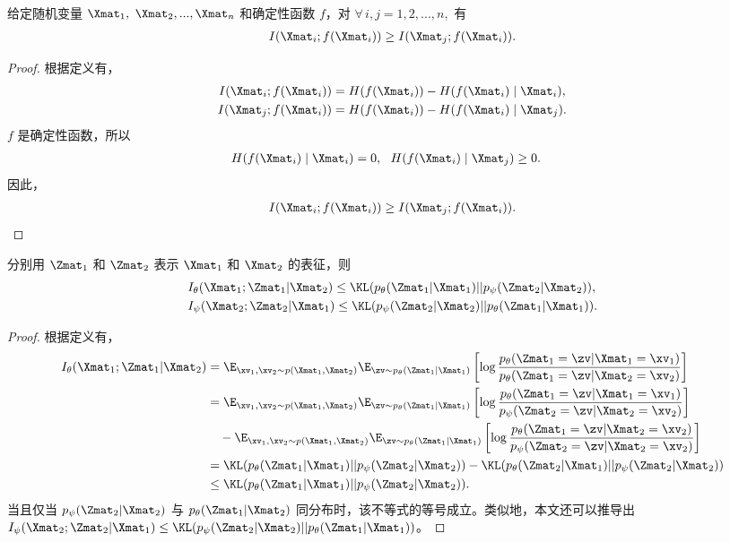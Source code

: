 \begin{lemma}
\label{lem:mi_xz_mutual}
给定随机变量 $\Xmat_1,$ $\Xmat_2, ..., \Xmat_n$ 和确定性函数 $f$，对 $\forall \, i, j = 1, 2, ..., n,$ 有
\begin{align}
I(\Xmat_i; f(\Xmat_i)) \ge I(\Xmat_j; f(\Xmat_i)). 
\end{align}
\end{lemma}
\begin{proof}
根据定义有，
\begin{align*}
I(\Xmat_i; f(\Xmat_i)) &= H(f(\Xmat_i)) - H(f(\Xmat_i) \mid \Xmat_i), \\
I(\Xmat_j; f(\Xmat_i)) &= H(f(\Xmat_i)) - H(f(\Xmat_i) \mid \Xmat_j). 
\end{align*}
$f$ 是确定性函数，所以
\begin{align*}
H(f(\Xmat_i) \mid \Xmat_i) &= 0, ~~H(f(\Xmat_i) \mid \Xmat_j) \ge 0. 
\end{align*}
因此，
\begin{align*}
I(\Xmat_i; f(\Xmat_i)) \ge I(\Xmat_j; f(\Xmat_i)).
\end{align*}
\end{proof}


\begin{lemma}
分别用 $\Zmat_1$ 和 $\Zmat_2$ 表示 $\Xmat_1$ 和 $\Xmat_2$ 的表征，则
\begin{align}
&I_\theta(\Xmat_1;\Zmat_1|\Xmat_2) \le \KL(p_\theta(\Zmat_1|\Xmat_1)||p_\psi(\Zmat_2|\Xmat_2)), \\
&I_\psi(\Xmat_2;\Zmat_2|\Xmat_1) \le \KL(p_\psi(\Zmat_2|\Xmat_2)||p_\theta(\Zmat_1|\Xmat_1)). 
\end{align} 
\end{lemma} 
\begin{proof}
根据定义有，
\begin{align*}
I_\theta(\Xmat_1; \Zmat_1|\Xmat_2)
&= \E_{\xv_1, \xv_2 \sim p(\Xmat_1, \Xmat_2)} \E_{\zv \sim p_\theta(\Zmat_1|\Xmat_1)}\left[\log\frac{p_\theta(\Zmat_1 = \zv|\Xmat_1=\xv_1)}{p_\theta(\Zmat_1=\zv|\Xmat_2=\xv_2)}\right]\\
&=\E_{\xv_1, \xv_2\sim p(\Xmat_1, \Xmat_2)}\E_{\zv \sim p_\theta(\Zmat_1|\Xmat_1)}\left[\log\frac{p_\theta(\Zmat_1=\zv | \Xmat_1=\xv_1)}{p_\psi(\Zmat_2 = \zv | \Xmat_2 = \xv_2)}
\right] \\ 
&\quad - \E_{\xv_1, \xv_2 \sim p(\Xmat_1, \Xmat_2)}\E_{\zv \sim p_\theta(\Zmat_1|\Xmat_1)}\left[\log\frac{p_\theta(\Zmat_1 = \zv | \Xmat_2=\xv_2)}{p_\psi(\Zmat_2=\zv | \Xmat_2= \xv_2)}
\right]
\\ 
&=\KL(p_\theta(\Zmat_1|\Xmat_1)||p_\psi(\Zmat_2|\Xmat_2)) - \KL(p_\theta(\Zmat_2|\Xmat_1)||p_\psi(\Zmat_2|\Xmat_2))\\ 
&\le \KL(p_\theta(\Zmat_1|\Xmat_1)||p_\psi(\Zmat_2|\Xmat_2)). 
\end{align*} 
当且仅当 $p_\psi(\Zmat_2|\Xmat_2)$ 与 $p_\theta(\Zmat_1|\Xmat_2)$ 同分布时，该不等式的等号成立。类似地，本文还可以推导出 $I_\psi(\Xmat_2; \Zmat_2|\Xmat_1)\le \KL(p_\psi(\Zmat_2|\Xmat_2)||p_\theta(\Zmat_1|\Xmat_1))$。
\end{proof}


